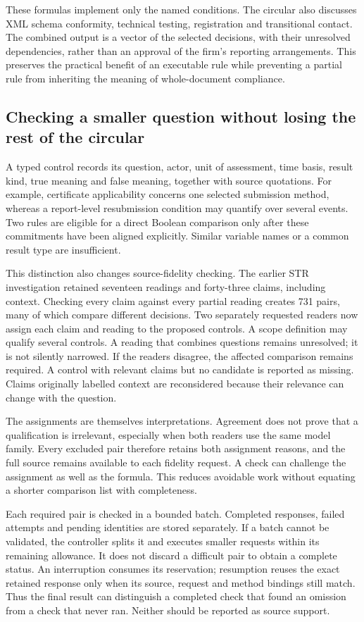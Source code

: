 \documentclass[12pt,a4paper,oneside,openany]{book}
\begin{document}
These formulas implement only the named conditions. The circular also discusses
XML schema conformity, technical testing, registration and transitional contact.
The combined output is a vector of the selected decisions, with their unresolved
dependencies, rather than an approval of the firm's reporting arrangements.
This preserves the practical benefit of an executable rule while preventing a
partial rule from inheriting the meaning of whole-document compliance.

\subsection{Checking a smaller question without losing the rest of the circular}

A typed control records its question, actor, unit of assessment, time basis,
result kind, true meaning and false meaning, together with source quotations.
For example, certificate applicability concerns one selected submission method,
whereas a report-level resubmission condition may quantify over several events.
Two rules are eligible for a direct Boolean comparison only after these
commitments have been aligned explicitly. Similar variable names or a common
result type are insufficient.

This distinction also changes source-fidelity checking. The earlier STR
investigation retained seventeen readings and forty-three claims, including
context. Checking every claim against every partial reading creates 731 pairs,
many of which compare different decisions. Two separately requested readers now
assign each claim and reading to the proposed controls. A scope definition may
qualify several controls. A reading that combines questions remains unresolved;
it is not silently narrowed. If the readers disagree, the affected comparison
remains required. A control with relevant claims but no candidate is reported
as missing. Claims originally labelled context are reconsidered because their
relevance can change with the question.

The assignments are themselves interpretations. Agreement does not prove that
a qualification is irrelevant, especially when both readers use the same model
family. Every excluded pair therefore retains both assignment reasons, and the
full source remains available to each fidelity request. A check can challenge
the assignment as well as the formula. This reduces avoidable work without
equating a shorter comparison list with completeness.

Each required pair is checked in a bounded batch. Completed responses, failed
attempts and pending identities are stored separately. If a batch cannot be
validated, the controller splits it and executes smaller requests within its
remaining allowance. It does not discard a difficult pair to obtain a complete
status. An interruption consumes its reservation; resumption reuses the exact
retained response only when its source, request and method bindings still match.
Thus the final result can distinguish a completed check that found an omission
from a check that never ran. Neither should be reported as source support.
\end{document}
